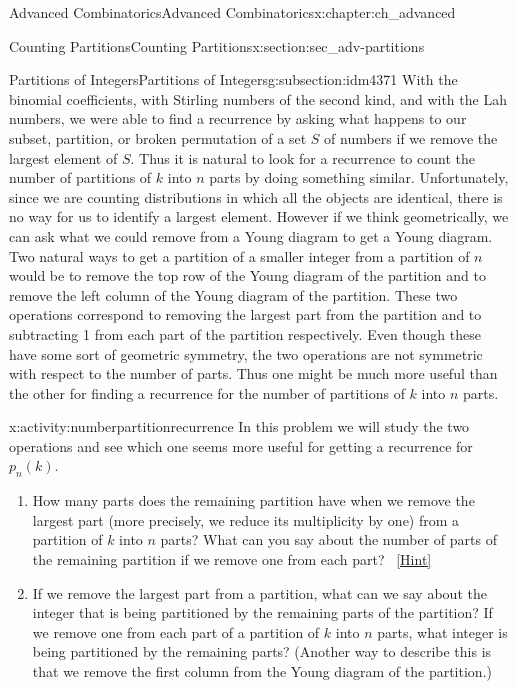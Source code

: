 \documentclass[oneside,10pt,]{book}
\numberwithin{equation}{chapter}
\begin{document}
\begin{chapterptx}{Advanced Combinatorics}{}{Advanced Combinatorics}{}{}{x:chapter:ch_advanced}
\begin{sectionptx}{Counting Partitions}{}{Counting Partitions}{}{}{x:section:sec_adv-partitions}
\begin{subsectionptx}{Partitions of Integers}{}{Partitions of Integers}{}{}{g:subsection:idm4371}
With the binomial coefficients, with Stirling numbers of the second kind, and with the Lah numbers, we were able to find a recurrence by asking what happens to our subset, partition, or broken permutation of a set \(S\) of numbers if we remove the largest element of \(S\). Thus it is natural to look for a recurrence to count the number of partitions of \(k\) into \(n\) parts by doing something similar. Unfortunately, since we are counting distributions in which all the objects are identical, there is no way for us to identify a largest element. However if we think geometrically, we can ask what we could remove from a Young diagram to get a Young diagram. Two natural ways to get a partition of a smaller integer from a partition of \(n\) would be to remove the top row of the Young diagram of the partition and to remove the left column of the Young diagram of the partition. These two operations correspond to removing the largest part from the partition and to subtracting 1 from each part of the partition respectively. Even though these have some sort of geometric symmetry, the two operations are not symmetric with respect to the number of parts. Thus one might be much more useful than the other for finding a recurrence for the number of partitions of \(k\) into \(n\) parts.%
\begin{activity}{}{x:activity:numberpartitionrecurrence}%
In this problem we will study the two operations and see which one seems more useful for getting a recurrence for \(p_n(k)\).%
\begin{enumerate}[font=\bfseries,label=(\alph*),ref=\alph*]
\item{}How many parts does the remaining partition have when we remove the largest part (more precisely, we reduce its multiplicity by one) from a partition of \(k\) into \(n\) parts?  What can you say about the number of parts of the remaining partition if we remove one from each part?%
\qquad~\hfill{\tiny\hyperlink{g:hint:idm4591-back}{[Hint]}}\item{}If we remove the largest part from a partition, what can we say about the integer that is being partitioned by the remaining parts of the partition? If we remove one from each part of a partition of \(k\) into \(n\) parts, what integer is being partitioned by the remaining parts? (Another way to describe this is that we remove the first column from the Young diagram of the partition.)%

\end{enumerate}
\end{activity}
\end{subsectionptx}
\end{sectionptx}
\end{chapterptx}
\end{document}
